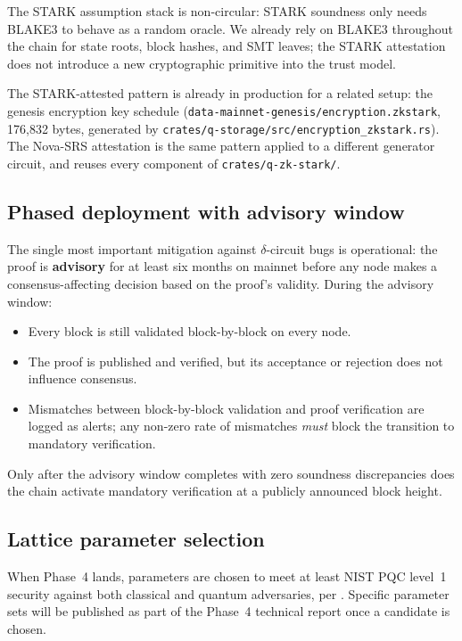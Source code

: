 \documentclass[11pt,a4paper]{article}
\begin{document}
The STARK assumption stack is non-circular: STARK soundness only needs
BLAKE3 to behave as a random oracle. We already rely on BLAKE3 throughout
the chain for state roots, block hashes, and SMT leaves; the STARK
attestation does not introduce a new cryptographic primitive into the
trust model.

The STARK-attested pattern is already in production for a related setup:
the genesis encryption key schedule (\texttt{data-mainnet-genesis/encryption.zkstark},
176{,}832 bytes, generated by \texttt{crates/q-storage/src/encryption\_zkstark.rs}).
The Nova-SRS attestation is the same pattern applied to a different generator
circuit, and reuses every component of \texttt{crates/q-zk-stark/}.

\subsection{Phased deployment with advisory window}

The single most important mitigation against $\delta$-circuit bugs is
operational: the proof is \textbf{advisory} for at least six months on
mainnet before any node makes a consensus-affecting decision based on
the proof's validity. During the advisory window:

\begin{itemize}[leftmargin=*]
  \item Every block is still validated block-by-block on every node.
  \item The proof is published and verified, but its acceptance or
        rejection does not influence consensus.
  \item Mismatches between block-by-block validation and proof
        verification are logged as alerts; any non-zero rate of
        mismatches \emph{must} block the transition to mandatory
        verification.
\end{itemize}

Only after the advisory window completes with zero soundness
discrepancies does the chain activate mandatory verification at a
publicly announced block height.

\subsection{Lattice parameter selection}

When Phase~4 lands, parameters are chosen to meet at least NIST PQC
level~1 security against both classical and quantum adversaries, per
\cite{NISTPQC2022}. Specific parameter sets will be published as
part of the Phase~4 technical report once a candidate is chosen.
\end{document}
